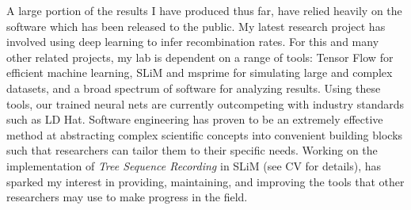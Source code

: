 \documentclass[12pt]{amsart}
\newcommand{\sepspace}{\vspace*{1em}}		%
\begin{document}
A large portion of the results I have produced thus far, have relied heavily on the software which has been released to the public.
My latest research project has involved using deep learning to infer recombination rates. 
For this and many other related projects, my lab is dependent on a range of tools: 
Tensor Flow for efficient machine learning, 
SLiM and msprime for simulating large and complex datasets,
and a broad spectrum of software for analyzing results.  
Using these tools, our trained neural nets are currently outcompeting with industry standards such as LD Hat.
Software engineering has proven to be an extremely effective method at abstracting complex scientific concepts into convenient building blocks such that researchers can tailor them to their specific needs.
Working on the implementation of \textit{Tree Sequence Recording} in SLiM (see CV for details), has sparked my interest in
providing, maintaining, and improving the tools that other researchers may use to make progress in the field.
\sepspace
\end{document}
